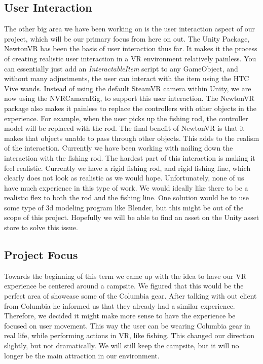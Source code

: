 \documentclass[10pt,journal,compsoc,onecolumn, draftclsnofoot]{IEEEtran}
\begin{document}
\subsection{User Interaction}
The other big area we have been working on is the user interaction aspect of our project, which will be our primary focus from here on out.
The Unity Package, NewtonVR has been the basis of user interaction thus far.
It makes it the process of creating realistic user interaction in a VR environment relatively painless.
You can essentially just add an \textit{InteractableItem} script to any GameObject, and without many adjustments, the user can interact with the item using the HTC Vive wands.
Instead of using the default SteamVR camera within Unity, we are now using the NVRCameraRig, to support this user interaction.
The NewtonVR package also makes it painless to replace the controllers with other objects in the experience.
For example, when the user picks up the fishing rod, the controller model will be replaced with the rod.
The final benefit of NewtonVR is that it makes that objects unable to pass through other objects.
This adds to the realism of the interaction.
Currently we have been working with nailing down the interaction with the fishing rod.
The hardest part of this interaction is making it feel realistic.
Currently we have a rigid fishing rod, and rigid fishing line, which clearly does not look as realistic as we would hope.
Unfortunately, none of us have much experience in this type of work.
We would ideally like there to be a realistic flex to both the rod and the fishing line.
One solution would be to use some type of 3d modeling program like Blender, but this might be out of the scope of this project.
Hopefully we will be able to find an asset on the Unity asset store to solve this issue.

\subsection{Project Focus}
Towards the beginning of this term we came up with the idea to have our VR experience be centered around a campsite.
We figured that this would be the perfect area of showcase some of the Columbia gear.
After talking with out client from Columbia he informed us that they already had a similar experience.
Therefore, we decided it might make more sense to have the experience be focused on user movement.
This way the user can be wearing Columbia gear in real life, while performing actions in VR, like fishing.
This changed our direction slightly, but not dramatically.
We will still keep the campsite, but it will no longer be the main attraction in our environment.
\end{document}
